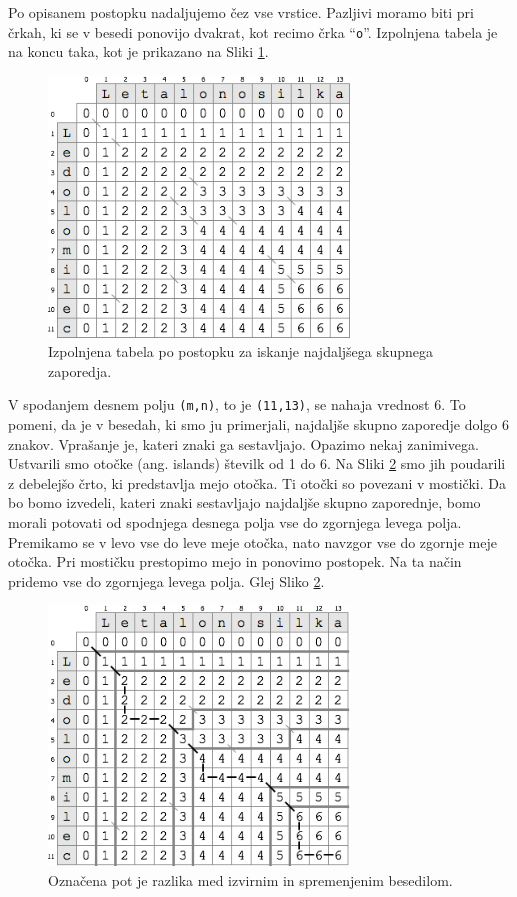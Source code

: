 \documentclass[a4paper, 12pt, twoside]{book}
\begin{document}
Po opisanem postopku nadaljujemo čez vse vrstice. Pazljivi moramo biti pri črkah, ki se v besedi ponovijo dvakrat, kot recimo črka “{\tt o}”. Izpolnjena tabela je na koncu taka, kot je prikazano na Sliki \ref{lcs4}.

\begin{figure}[placement h]
\begin{center}
\includegraphics[width=8cm]{lcs4.png}
\end{center}
\caption{Izpolnjena tabela po postopku za iskanje najdaljšega skupnega zaporedja.}
\label{lcs4}
\end{figure}

V spodanjem desnem polju {\tt (m,n)}, to je {\tt (11,13)}, se nahaja vrednost 6. To pomeni, da je v besedah, ki smo ju primerjali, najdaljše skupno zaporedje dolgo 6 znakov. Vprašanje je, kateri znaki ga sestavljajo. Opazimo nekaj zanimivega. Ustvarili smo otočke (ang. islands) številk od 1 do 6. Na Sliki \ref{lcs5} smo jih poudarili z debelejšo črto, ki predstavlja mejo otočka. Ti otočki so povezani v mostički. Da bo bomo izvedeli, kateri znaki sestavljajo najdaljše skupno zaporednje, bomo morali potovati od spodnjega desnega polja vse do zgornjega levega polja. Premikamo se v levo vse do leve meje otočka, nato navzgor vse do zgornje meje otočka. Pri mostičku prestopimo mejo in ponovimo postopek. Na ta način pridemo vse do zgornjega levega polja. Glej Sliko \ref{lcs5}.

\begin{figure}[placement h]
\begin{center}
\includegraphics[width=8cm]{lcs5.png}
\end{center}
\caption{Označena pot je razlika med izvirnim in spremenjenim besedilom.}
\label{lcs5}
\end{figure}
\end{document}
